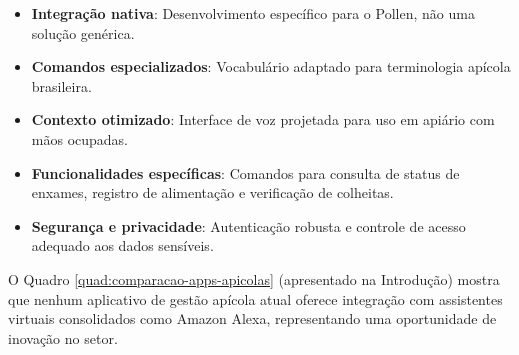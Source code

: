 \begin{itemize}
    \item \textbf{Integração nativa}: Desenvolvimento específico para o Pollen, não uma solução genérica.
    \item \textbf{Comandos especializados}: Vocabulário adaptado para terminologia apícola brasileira.
    \item \textbf{Contexto otimizado}: Interface de voz projetada para uso em apiário com mãos ocupadas.
    \item \textbf{Funcionalidades específicas}: Comandos para consulta de status de enxames, registro de alimentação e verificação de colheitas.
    \item \textbf{Segurança e privacidade}: Autenticação robusta e controle de acesso adequado aos dados sensíveis.
\end{itemize}

O Quadro \ref{quad:comparacao-apps-apicolas} (apresentado na Introdução) mostra que nenhum aplicativo de gestão apícola atual oferece integração com assistentes virtuais consolidados como Amazon Alexa, representando uma oportunidade de inovação no setor.
















